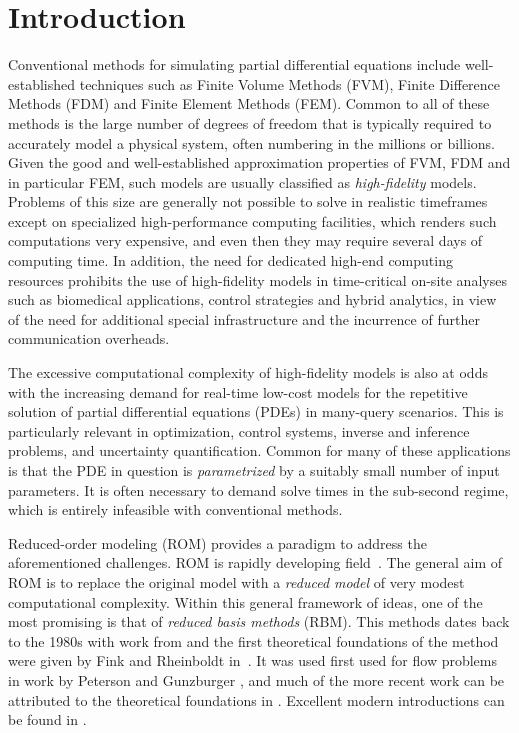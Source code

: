 \documentclass[onecolumn, twoside, a4paper, 11pt]{article}
\begin{document}
\section{Introduction}

Conventional methods for simulating partial differential equations include
well-established techniques such as Finite Volume Methods (FVM),
Finite Difference Methods (FDM) and Finite Element Methods (FEM).
Common to all of these methods is the large number of
degrees of freedom that is typically required to accurately model a physical system, often
numbering in the millions or billions. Given the good and well-established
approximation properties of FVM, FDM and in particular FEM, such models are
usually classified as \emph{high-fidelity} models. Problems of this size are
generally not possible to solve in realistic timeframes except on specialized
high-performance computing facilities, which renders such computations very expensive,
and even then they may require several days of computing time. In addition, the
need for dedicated high-end computing resources prohibits the use of high-fidelity
models in time-critical on-site analyses such as biomedical applications, control strategies
and hybrid analytics, in view of the need for additional special infrastructure and
the incurrence of further communication overheads.

The excessive computational complexity of high-fidelity models is also at odds
with the increasing demand for real-time low-cost models for the repetitive solution of
partial differential equations (PDEs)
in many-query scenarios. This is particularly relevant in optimization, control systems,
inverse and inference problems, and uncertainty quantification. Common for many of these
applications is that the PDE in question is
\emph{parametrized} by a suitably small number of input parameters. It is often necessary
to demand solve times in the sub-second regime, which is entirely infeasible with conventional
methods.

Reduced-order modeling (ROM) provides a paradigm to address the aforementioned challenges.
ROM is rapidly developing field~\cite{Bazaz2012rpm}. The general aim of ROM is to replace
the original model with a \emph{reduced model} of very modest computational complexity. Within this
general framework of ideas, one of the most promising is that of \emph{reduced
basis methods} (RBM). This methods dates back to the 1980s with work from
\cite{Almroth1978acg,Almroth1981gfi,Nagy1979mrg,Noor1980rbt,Noor1981bpb,Noor1981rar,Noor1982mln}
and the first theoretical foundations of the method were given by Fink and
Rheinboldt in~\cite{Fink1983ebr,Fink1984sms}.
It was used first used for flow problems in work by Peterson and Gunzburger
\cite{Gunzburger2012fem,Peterson1989rbm}, and much of the more recent work can
be attributed to the theoretical foundations in
\cite{Prudhomme2002mcf,Veroy2003peb}.
Excellent modern introductions can be found in \cite{Quarteroni2016rbm,Haasdonk2017rbm}.
\end{document}
